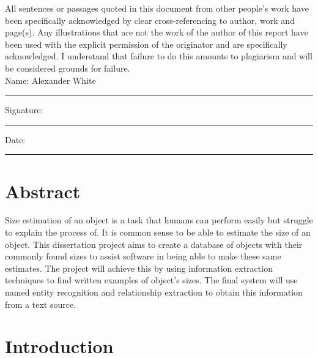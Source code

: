 \documentclass[11pt,oneside]{book}
\begin{document}
All sentences or passages quoted in this document from other people's work have been specifically acknowledged by clear cross-referencing to author, work and page(s).  Any illustrations that are not the work of the author of this report have been used with the explicit permission of the originator and are specifically acknowledged.  I understand that failure to do this amounts to plagiarism and will be considered grounds for failure.\\[1cm]

\noindent Name: Alexander White\\[1mm]
\rule[1em]{25em}{0.5pt}

\noindent Signature:\\[1mm]
\rule[1em]{25em}{0.5pt}

\noindent Date:\\[1mm]
\rule[1em]{25em}{0.5pt}



\chapter*{\Large \center Abstract}

Size estimation of an object is a task that humans can perform easily but struggle to explain the process of. It is common sense to be able to estimate the size of an object. This dissertation project aims to create a database of objects with their commonly found sizes to assist software in being able to make these same estimates. The project will achieve this by using information extraction techniques to find written examples of object's sizes. The final system will use named entity recognition and relationship extraction to obtain this information from a text source.


\tableofcontents
\listoffigures
\listoftables



\mainmatter

\chapter{Introduction}
\end{document}
